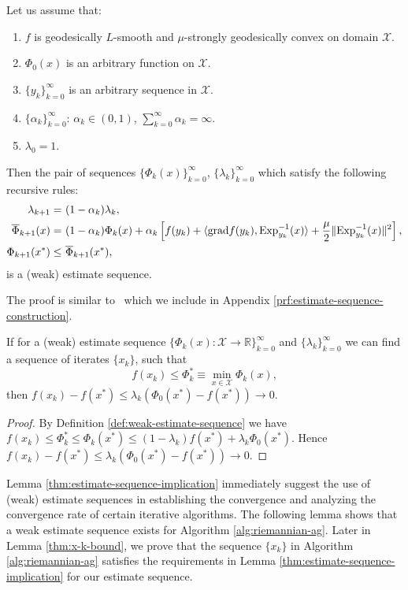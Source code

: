 \begin{lemma} \label{thm:estimate-sequence-construction}
	Let us assume that:
	\begin{enumerate}
          \setlength{\itemsep}{1pt}
		\item $f$ is geodesically $L$-smooth and $\mu$-strongly geodesically convex on domain $\mathcal{X}$.
		\item $\Phi_0(x)$ is an arbitrary function on $\mathcal{X}$.
		\item $\{y_k\}_{k=0}^{\infty}$ is an arbitrary sequence in $\mathcal{X}$.
		\item $\{\alpha_k\}_{k=0}^{\infty}$: $\alpha_k\in(0,1)$,  $\sum_{k=0}^{\infty} \alpha_k = \infty$. \label{eq:alpha-k-not-summable}
		\item $\lambda_0 = 1$.
	\end{enumerate}
	Then the pair of sequences $\{\Phi_k(x)\}_{k=0}^{\infty}$, $\{\lambda_k\}_{k=0}^{\infty}$ which satisfy the following recursive rules:
	\begin{align}
	\lambda_{k+1} = &~ (1-\alpha_k)\lambda_k, \\
	\overline{\Phi}_{k+1}(x) = &~ (1-\alpha_k)\Phi_k(x) + \alpha_k \left[f(y_k) + \langle \mathrm{grad} f(y_k), \mathrm{Exp}_{y_k}^{-1}(x)\rangle + \frac{\mu}{2}\|\mathrm{Exp}_{y_k}^{-1}(x)\|^2\right], \label{eq:phi-recursion}\\
	\Phi_{k+1}(x^*) \le &~ \overline{\Phi}_{k+1}(x^*), \label{eq:phi-less-overline-phi}
	\end{align}
	is a (weak) estimate sequence.
\end{lemma}
	The proof is similar to~\citep[Lemma 2.2.2]{nesterov2004introductory} which we include in Appendix \ref{prf:estimate-sequence-construction}.

\begin{lemma} \label{thm:estimate-sequence-implication}
	If for a (weak) estimate sequence $\{\Phi_{k}(x):\mathcal{X}\to\mathbb{R}\}_{k=0}^{\infty}$ and $\{\lambda_k\}_{k=0}^{\infty}$ we can find a sequence of iterates $\{x_k\}$, such that
	\[ f(x_k) \le \Phi_k^* \equiv \min_{x\in\mathcal{X}}\Phi_k(x), \]
	then $f(x_k)-f(x^*) \le \lambda_k(\Phi_0(x^*)-f(x^*)) \to 0$.
\end{lemma}
\begin{proof} By Definition \ref{def:weak-estimate-sequence} we have
	$f(x_k)\le \Phi_k^* \le \Phi_k(x^*) \le (1-\lambda_k)f(x^*) + \lambda_k\Phi_0(x^*)$.
	Hence $f(x_k) - f(x^*) \le \lambda_k(\Phi_0(x^*) - f(x^*)) \to 0$.
\end{proof}
Lemma \ref{thm:estimate-sequence-implication} immediately suggest the use of (weak) estimate sequences in establishing the convergence and analyzing the convergence rate of certain iterative algorithms. The following lemma shows that a weak estimate sequence exists for Algorithm \ref{alg:riemannian-ag}. Later in Lemma \ref{thm:x-k-bound}, we prove that the sequence $\{x_k\}$ in Algorithm \ref{alg:riemannian-ag} satisfies the requirements in Lemma \ref{thm:estimate-sequence-implication} for our estimate sequence.

